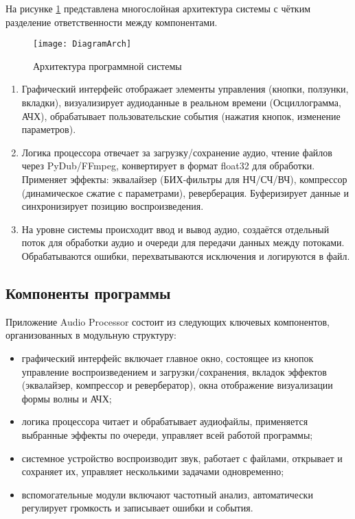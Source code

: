 На рисунке \ref{DiagramArch:image} представлена многослойная архитектура системы с чётким разделение ответственности между компонентами.

\begin{figure}[p]  %
	\centering
	\texttt{[image: DiagramArch]}
	\caption{Архитектура программной системы}
	\label{DiagramArch:image}
\end{figure}
\clearpage

\begin{enumerate}
	\item Графический интерфейс отображает элементы управления (кнопки, ползунки, вкладки), визуализирует аудиоданные в реальном времени (Осциллограмма, АЧХ), обрабатывает пользовательские события (нажатия кнопок, изменение параметров).
	\item Логика процессора отвечает за загрузку/сохранение аудио, чтение файлов через PyDub/FFmpeg, конвертирует в формат float32 для обработки. Применяет эффекты: эквалайзер (БИХ-фильтры для НЧ/СЧ/ВЧ), компрессор (динамическое сжатие с параметрами), реверберация. Буферизирует данные и синхронизирует позицию воспроизведения.
	\item На уровне системы происходит ввод и вывод аудио, создаётся отдельный поток для обработки аудио и очереди для передачи данных между потоками. Обрабатываются ошибки, перехватываются исключения и логируются в файл.
\end{enumerate}

\subsection{Компоненты программы}

Приложение Audio Processor состоит из следующих ключевых компонентов, организованных в модульную структуру:
\begin{itemize}
	\item графический интерфейс включает главное окно, состоящее из кнопок управление воспроизведением и загрузки/сохранения, вкладок эффектов (эквалайзер, компрессор и ревербератор), окна отображение визуализации формы волны и АЧХ;
	\item логика процессора читает и обрабатывает аудиофайлы, применяется выбранные эффекты по очереди, управляет всей работой программы;
	\item системное устройство воспроизводит звук, работает с файлами, открывает и сохраняет их, управляет несколькими задачами одновременно;
	\item вспомогательные модули включают частотный анализ, автоматически регулирует громкость и записывает ошибки и события.
\end{itemize}


